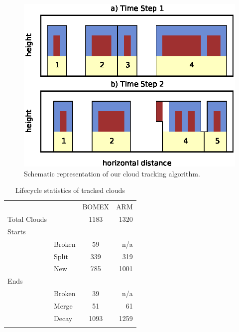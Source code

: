 \documentclass[acp]{copernicus}
\begin{document}

\begin{figure}[t]
\vspace*{2mm}
\begin{center}
\includegraphics[width=\textwidth]{./figures/cloudfinder_instructions}
\end{center}
\caption{Schematic representation of our cloud tracking algorithm.}
\label{fig:cloudfinder_instructions}
\end{figure}





\begin{table}[t]
\caption{Lifecycle statistics of tracked clouds}
\vskip4mm
\centering
\begin{tabular}{llcr}
\tophline
&&BOMEX&ARM\\
\middlehline
Total Clouds&&1183&1320\\
Starts\\
&Broken&59&n/a\\
&Split&339&319\\
&New&785&1001\\
Ends\\
&Broken&39&n/a\\
&Merge&51&61\\
&Decay&1093&1259\\

\bottomhline
\end{tabular}
\end{table}
\end{document}
